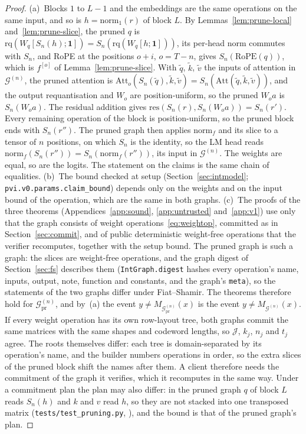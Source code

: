 \begin{proof}
(a)~Blocks $1$ to $L-1$ and the embeddings are the same operations on the same input, and so is
$h=\mathrm{norm}_1(r)$ of block $L$. By Lemmas~\ref{lem:prune-local} and~\ref{lem:prune-slice},
the pruned $q$ is $\mathrm{rq}(W_q[S_n(h);\mathbf 1])=S_n(\mathrm{rq}(W_q[h;\mathbf 1]))$, its
per-head norm commutes with $S_n$, and RoPE at the positions $o+i$, $o=T-n$, gives
$S_n(\mathrm{RoPE}(q))$, which is $f^{[o]}$ of Lemma~\ref{lem:prune-slice}. With $\tilde q$,
$\tilde k$, $\tilde v$ the inputs of attention in $\mathcal G^{(n)}$, the pruned attention is
$\mathrm{Att}_o(S_n(\tilde q),\tilde k,\tilde v)=S_n(\mathrm{Att}(\tilde q,\tilde k,\tilde v))$, and
the output requantisation and $W_o$ are position-uniform, so the pruned $W_oa$ is $S_n(W_oa)$. The
residual addition gives $\mathrm{res}(S_n(r),S_n(W_oa))=S_n(r')$. Every remaining operation of the
block is position-uniform, so the pruned block ends with $S_n(r'')$. The pruned graph then applies
$\mathrm{norm}_f$ and its slice to a tensor of $n$ positions, on which $S_n$ is the identity, so the
LM head reads $\mathrm{norm}_f(S_n(r''))=S_n(\mathrm{norm}_f(r''))$, its input in
$\mathcal G^{(n)}$. The weights are equal, so are the logits. The statement on the claims is the
same chain of equalities.
(b)~The bound checked at setup (Section~\ref{sec:intmodel}; \texttt{pvi.v0.params.claim\_bound})
depends only on the weights and on the input bound of the operation, which are the same in both
graphs.
(c)~The proofs of the three theorems (Appendices~\ref{app:sound}, \ref{app:untrusted}
and~\ref{app:v1}) use only that the graph consists of weight operations~\eqref{eq:weightop},
committed as in Section~\ref{sec:commit}, and of public deterministic weight-free operations
that the verifier recomputes, together with the setup bound. The pruned graph is such a graph: the
slices are weight-free operations, and the graph digest of Section~\ref{sec:fs} describes them
(\texttt{IntGraph.digest} hashes every operation's name, inputs, output, note, function and
constants, and the graph's \texttt{meta}), so the statements of the two graphs differ under
Fiat--Shamir. The theorems therefore hold for $\mathcal G^{(n)}_{\mathrm{pr}}$, and by~(a) the event
$y\neq M_{\mathcal G^{(n)}_{\mathrm{pr}}}(x)$ is the event $y\neq M_{\mathcal G^{(n)}}(x)$. If every
weight operation has its own row-layout tree, both graphs commit the same matrices with the same
shapes and codeword lengths, so $\mathcal J$, $k_j$, $n_j$ and $t_j$ agree. The roots themselves
differ: each tree is domain-separated by its operation's name, and the builder numbers operations in
order, so the extra slices of the pruned block shift the names after them. A client therefore needs
the commitment of the graph it verifies, which it recomputes in the same way. Under a commitment
plan the plan may also differ: in the pruned graph $q$ of block $L$ reads $S_n(h)$ and $k$ and $v$
read $h$, so they are not stacked into one transposed matrix (\texttt{tests/test\_pruning.py},
), and the bound is that of the pruned
graph's plan.
\end{proof}

